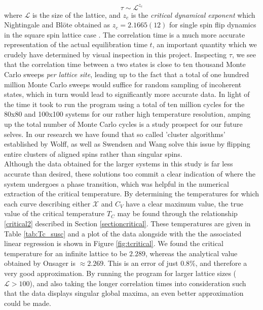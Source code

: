 \[
\tau \sim \mathcal{L}^{z_c}
\]
where $\mathcal{L}$ is the size of the lattice, and $z_c$ is the \textit{critical dynamical exponent} which Nightingale and Blöte obtained as $z_c = 2.1665(12)$ for single spin flip dynamics in the square spin lattice case \cite{nightingale}. The correlation time is a much more accurate representation of the actual equilibration time $t$, an important quantity which we crudely have determined by visual inspection in this project. Inspecting $\tau$, we see that the correlation time between a two states is close to ten thousand Monte Carlo sweeps \textit{per lattice site}, leading up to the fact that a total of one hundred million Monte Carlo sweeps would suffice for random sampling of incoherent states, which in turn would lead to significantly more accurate data. In light of the time it took to run the program using a total of ten million cycles for the 80x80 and 100x100 systems for our rather high temperature resolution, amping up the total number of Monte Carlo cycles is a study prospect for our future selves. In our research we have found that so called 'cluster algorithms' established by Wolff, as well as Swendsen and Wang \cite{walter} solve this issue by flipping entire clusters of aligned spins rather than singular spins.\\

Although the data obtained for the larger systems in this study is far less accurate than desired, these solutions too commit a clear indication of where the system undergoes a phase transition, which was helpful in the numerical extraction of the critical temperature. By determining the temperatures for which each curve describing either $\mathcal{X}$ and $C_V$ have a clear maximum value, the true value of the critical temperature $T_C$ may be found through the relationship \eqref{critical2} described in Section \ref{sectioncritical}. These temperatures are given in Table \ref{tab:Tc_susc} and a plot of the data alongside with the the associated linear regression is shown in Figure \ref{fig:tcritical}. We found the critical temperature for an infinite lattice to be $2.289$, whereas the analytical value obtained by Onsager is $\approx 2.269$. This is an error of just $0.8$\%, and therefore a very good approximation. By running the program for larger lattice sizes ($\mathcal{L} > 100$), and also taking the longer correlation times into consideration such that the data displays singular global maxima, an even better approximation could be made.